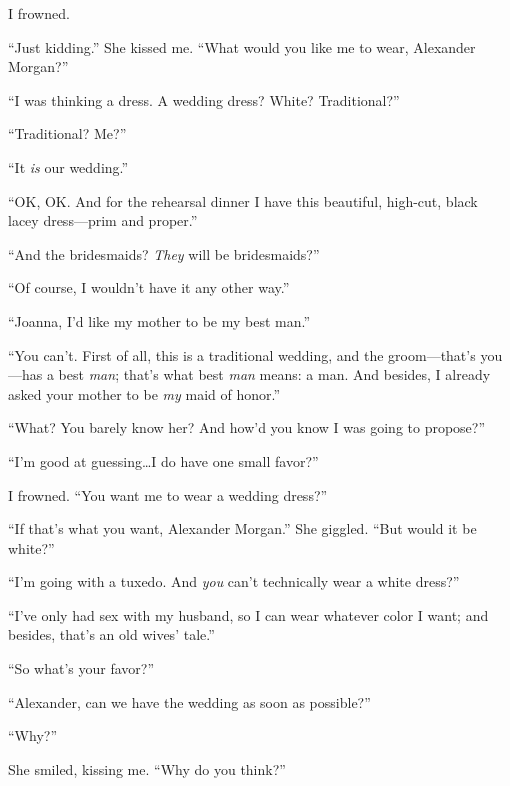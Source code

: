 I frowned.

``Just kidding.'' She kissed me. ``What would you like me to wear,
Alexander Morgan?''

``I was thinking a dress. A wedding dress? White? Traditional?''

``Traditional? Me?''

``It \emph{is} our wedding.''

``OK, OK. And for the rehearsal dinner I have this beautiful, high-cut,
black lacey dress---prim and proper.''

``And the bridesmaids? \emph{They} will be bridesmaids?''

``Of course, I wouldn't have it any other way.''

``Joanna, I'd like my mother to be my best man.''

``You can't. First of all, this is a traditional wedding, and the
groom---that's you---has a best \emph{man}; that's what best \emph{man}
means: a man. And besides, I already asked your mother to be \emph{my}
maid of honor.''

``What? You barely know her? And how'd you know I was going to
propose?''

``I'm good at guessing\ldots I do have one small favor?''

I frowned. ``You want me to wear a wedding dress?''

``If that's what you want, Alexander Morgan.'' She giggled. ``But would
it be white?''

``I'm going with a tuxedo. And \emph{you} can't technically wear a white
dress?''

``I've only had sex with my husband, so I can wear whatever color I
want; and besides, that's an old wives' tale.''

``So what's your favor?''

``Alexander, can we have the wedding as soon as possible?''

``Why?''

She smiled, kissing me. ``Why do you think?''
